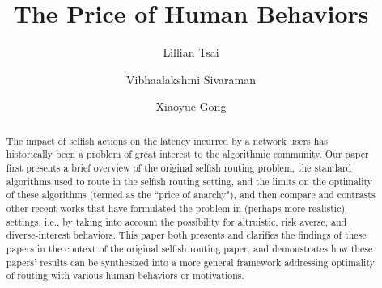 \documentclass[acmlarge]{acmart}
\begin{document}
\title{The Price of Human Behaviors}

\author{Lillian Tsai}
\author{Vibhaalakshmi Sivaraman}
\author{Xiaoyue Gong}

\begin{abstract}
The impact of selfish actions on the latency incurred by a network users has historically been a problem of great interest to the algorithmic community. Our paper first presents a brief overview of the original selfish routing problem, the standard algorithms used to route in the selfish routing setting, and the limits on the optimality of these algorithms (termed as the ``price of anarchy"), and then compare and contrasts other recent works that have formulated the problem in
    (perhaps more realistic) settings, i.e., by taking into account the possibility for altruistic, risk averse, and diverse-interest behaviors.  This paper both presents and clarifies the findings of these papers in the context of the original selfish routing paper, and demonstrates how these papers' results can be synthesized into a more general framework addressing optimality of routing with various human behaviors or motivations.
\end{abstract}


\maketitle

\end{document}
